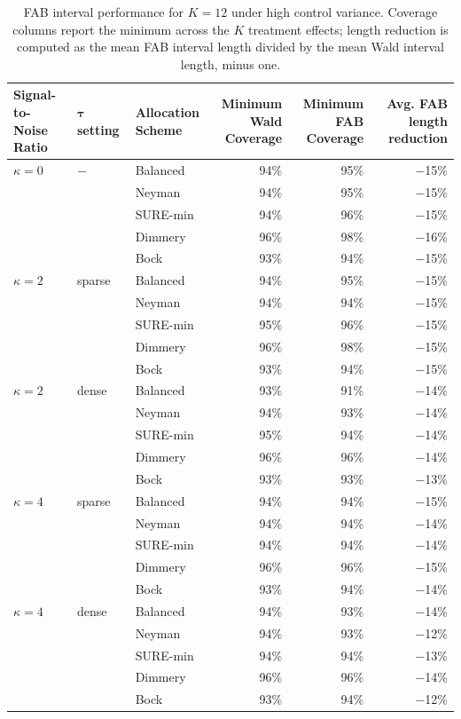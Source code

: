 \documentclass{article}
\newcommand{\bstau}{\boldsymbol \tau}
\begin{document}
\begin{table}[ht]
\centering
\begin{tabular}{lllrrr}
\toprule
\makecell[l]{Signal-to-\\Noise Ratio} & $\bstau$ setting & \makecell[l]{Allocation \\Scheme} & \makecell[l]{Minimum \\ Wald Coverage} & \makecell[l]{Minimum \\ FAB Coverage} & \makecell[l]{Avg. FAB\\length reduction} \\
\midrule
$\kappa=0$ & $-$ & Balanced & 94\% & 95\% & $-$15\% \\
 & & Neyman & 94\% & 95\% & $-$15\% \\
 & & SURE-min & 94\% & 96\% & $-$15\% \\
 & & Dimmery & 96\% & 98\% & $-$16\% \\
 & & Bock & 93\% & 94\% & $-$15\% \\
\addlinespace
$\kappa=2$ & sparse & Balanced & 94\% & 95\% & $-$15\% \\
 & & Neyman & 94\% & 94\% & $-$15\% \\
 & & SURE-min & 95\% & 96\% & $-$15\% \\
 & & Dimmery & 96\% & 98\% & $-$15\% \\
 & & Bock & 93\% & 94\% & $-$15\% \\
\addlinespace
$\kappa=2$ & dense & Balanced & 93\% & 91\% & $-$14\% \\
 & & Neyman & 94\% & 93\% & $-$14\% \\
 & & SURE-min & 95\% & 94\% & $-$14\% \\
 & & Dimmery & 96\% & 96\% & $-$14\% \\
 & & Bock & 93\% & 93\% & $-$13\% \\
\addlinespace
$\kappa=4$ & sparse & Balanced & 94\% & 94\% & $-$15\% \\
 & & Neyman & 94\% & 94\% & $-$14\% \\
 & & SURE-min & 94\% & 94\% & $-$14\% \\
 & & Dimmery & 96\% & 96\% & $-$15\% \\
 & & Bock & 93\% & 94\% & $-$14\% \\
\addlinespace
$\kappa=4$ & dense & Balanced & 94\% & 93\% & $-$14\% \\
 & & Neyman & 94\% & 93\% & $-$12\% \\
 & & SURE-min & 94\% & 94\% & $-$13\% \\
 & & Dimmery & 96\% & 96\% & $-$14\% \\
 & & Bock & 93\% & 94\% & $-$12\% \\
\bottomrule
\end{tabular}
\caption{FAB interval performance for $K=12$ under high control variance. Coverage columns report the minimum across the $K$ treatment effects; length reduction is computed as the mean FAB interval length divided by the mean Wald interval length, minus one.}
\label{tab:k12-fab-high-hetero-high-v}
\end{table}
\end{document}
